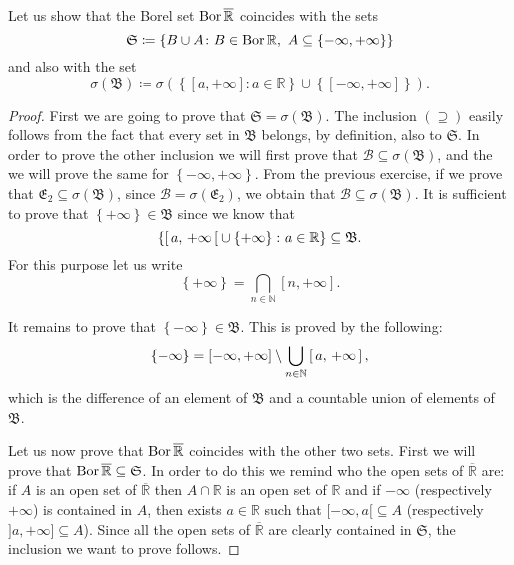 \documentclass[../EserciziIstituzioniAnalisi.tex]{subfiles}
\begin{document}
\begin{exercise}[2016-10-10-1]
  Let us show that the Borel set $\operatorname{Bor}{\overline{\mathbb{R}}}$ coincides with the sets
  \begin{equation*}
    \mathfrak{S} \coloneqq \left\lbrace B \cup A \colon B \in \operatorname{Bor}{\mathbb{R}},\ A \subseteq \left\lbrace -\infty, +\infty\right\rbrace\right\rbrace
  \end{equation*}
  and also with the set
  \begin{equation*}
    \sigma(\mathfrak{B}) \coloneqq \sigma\left(\left\lbrace[a,+\infty] : a \in \mathbb{R}\right\rbrace \cup \left\lbrace[-\infty,+\infty]\right\rbrace\right).
  \end{equation*}
\end{exercise}
\begin{proof}
  First we are going to prove that $\mathfrak{S} = \sigma(\mathfrak{B})$.
  The inclusion $(\supseteq)$ easily follows from the fact that every set in $\mathfrak{B}$ belongs, by definition, also to $\mathfrak{S}$.
  In order to prove the other inclusion we will first prove that $\mathcal{B} \subseteq \sigma(\mathfrak{B})$, and the we will prove the same for $\left\lbrace -\infty, +\infty\right\rbrace$.
  From the previous exercise, if we prove that $\mathfrak{E_2} \subseteq \sigma(\mathfrak{B})$, since $\mathcal{B} = \sigma(\mathfrak{E_2})$, we obtain that $\mathcal{B} \subseteq \sigma(\mathfrak{B})$.
  It is sufficient to prove that $\left\lbrace +\infty\right\rbrace \in \mathfrak{B}$ since we know that
  \begin{equation*}
    \left\lbrace \left[\,a,\,+\infty\,\right[ \cup \left\lbrace +\infty\right\rbrace \colon a \in \mathbb{R}\right\rbrace \subseteq \mathfrak{B}.
  \end{equation*}
  For this purpose let us write
  \begin{equation*}
    \left\lbrace+\infty\right\rbrace = \bigcap_{n \in \mathbb{N}}[n,+\infty].
  \end{equation*}

  It remains to prove that $\left\lbrace -\infty\right\rbrace \in \mathfrak{B}$.
  This is proved by the following:
  \begin{equation*}
    \left\lbrace-\infty\right\rbrace = [-\infty,+\infty] \setminus \bigcup_{n \in \mathbb{N}}\left[\,a,\,+\infty\,\right],
  \end{equation*}
  which is the difference of an element of $\mathfrak{B}$ and a countable union of elements of $\mathfrak{B}$.
 
  Let us now prove that $\operatorname{Bor}{\overline{\mathbb{R}}}$ coincides with the other two sets.
  First we will prove that $\operatorname{Bor}{\overline{\mathbb{R}}} \subseteq \mathfrak{S}$.
  In order to do this we remind who the open sets of $\overline{\mathbb{R}}$ are: if $A$ is an open set of $\overline{\mathbb{R}}$ then $A \cap \mathbb{R}$ is an open set of $\mathbb{R}$ and if $-\infty$ (respectively $+\infty$) is contained in $A$, then exists $a \in \mathbb{R}$ such that $[-\infty,a[ \subseteq A$ (respectively $]a,+\infty] \subseteq A$).
Since all the open sets of $\overline{\mathbb{R}}$ are clearly contained in $\mathfrak{S}$, the inclusion we want to prove follows.


\end{proof}
\end{document}
